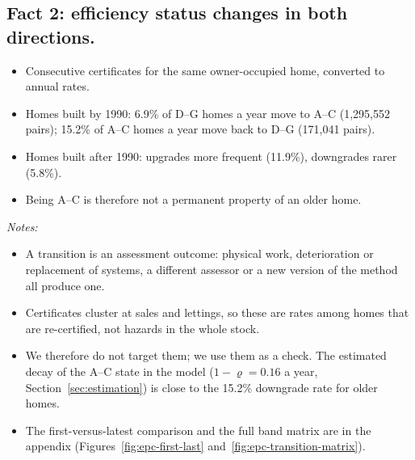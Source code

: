 \subsection{Fact 2: efficiency status changes in both directions.}

\begin{itemize}
  \item Consecutive certificates for the same owner-occupied home, converted
    to annual rates.
  \item Homes built by 1990: 6.9\% of D--G homes a year move to A--C
    (1,295,552 pairs); 15.2\% of A--C homes a year move back to D--G
    (171,041 pairs).
  \item Homes built after 1990: upgrades more frequent (11.9\%), downgrades
    rarer (5.8\%).
  \item Being A--C is therefore not a permanent property of an older home.
\end{itemize}

\begin{table}[t]
  \centering
  \caption{Transitions across the efficiency threshold between EPC
  certificates, owner-occupied homes}\label{tab:epc-transitions}
  \begin{threeparttable}
    \begin{tablenotes}[flushleft]\footnotesize
      \item \textit{Notes:} 
    \end{tablenotes}
  \end{threeparttable}
\end{table}

\begin{itemize}
  \item A transition is an assessment outcome: physical work, deterioration
    or replacement of systems, a different assessor or a new version of the
    method all produce one.
  \item Certificates cluster at sales and lettings, so these are rates among
    homes that are re-certified, not hazards in the whole stock.
  \item We therefore do not target them; we use them as a check. The
    estimated decay of the A--C state in the model ($1-\varrho = 0.16$ a
    year, Section~\ref{sec:estimation}) is close to the 15.2\% downgrade rate
    for older homes.
  \item The first-versus-latest comparison and the full band matrix are in
    the appendix (Figures~\ref{fig:epc-first-last}
    and~\ref{fig:epc-transition-matrix}).
\end{itemize}

